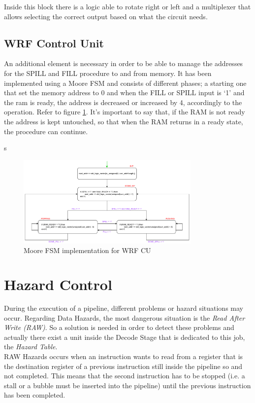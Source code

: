 Inside this block there is a logic able to rotate right or left and a multiplexer that allows selecting the correct output based on what the circuit needs. 

\subsection{WRF Control Unit}

An additional element is necessary in order to be able to manage the addresses for the SPILL and FILL procedure to and from memory. It has been implemented using a Moore FSM and consists of different phases; a starting one that set the memory address to 0 and when the FILL or SPILL input is `1' and the ram is ready, the address is decreased or increased by 4, accordingly to the operation. Refer to figure \ref{wrf_cu}. It's important to say that, if the RAM is not ready the address is kept untouched, so that when the RAM returns in a ready state, the procedure can continue.

s
\begin{figure}[ht]
	\centering
	\includegraphics[width=0.8\textwidth]{chapters/4_DecodeStage/images/wRF_CU.pdf}
	\caption{Moore FSM implementation for WRF CU}
	\label{wrf_cu}
\end{figure}

\section{Hazard Control}

During the execution of a pipeline, different problems or hazard situations may occur. Regarding Data Hazards, the most dangerous situation is the \emph{Read After Write (RAW)}. So a solution is needed in order to detect these problems and actually there exist a unit inside the Decode Stage that is dedicated to this job, the \emph{Hazard Table}.\\

RAW Hazards occurs when an instruction wants to read from a register that is the destination register of a previous instruction still inside the pipeline so and not completed. This means that the second instruction has to be stopped (i.e. a stall or a bubble must be inserted into the pipeline) until the previous instruction has been completed.\\

